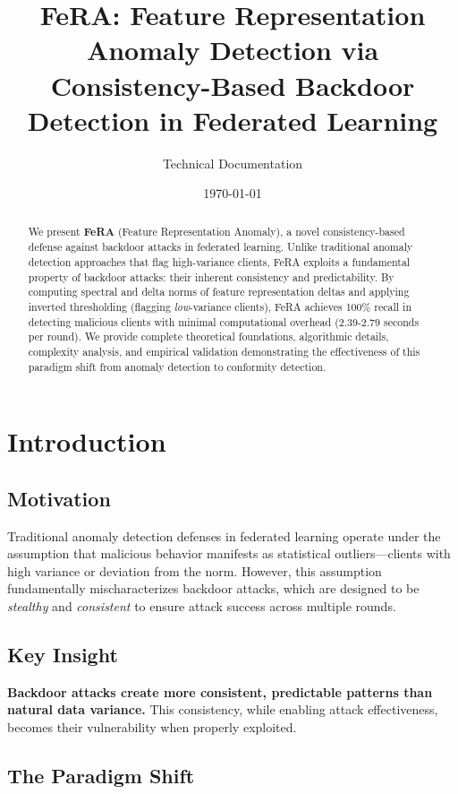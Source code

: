 \documentclass[11pt,a4paper]{article}
\title{\textbf{FeRA: Feature Representation Anomaly Detection via Consistency-Based Backdoor Detection in Federated Learning}}
\author{Technical Documentation}
\date{\today}
\begin{document}
\maketitle

\begin{abstract}
We present \textbf{FeRA} (Feature Representation Anomaly), a novel consistency-based defense against backdoor attacks in federated learning. Unlike traditional anomaly detection approaches that flag high-variance clients, FeRA exploits a fundamental property of backdoor attacks: their inherent consistency and predictability. By computing spectral and delta norms of feature representation deltas and applying inverted thresholding (flagging \emph{low}-variance clients), FeRA achieves 100\% recall in detecting malicious clients with minimal computational overhead (2.39-2.79 seconds per round). We provide complete theoretical foundations, algorithmic details, complexity analysis, and empirical validation demonstrating the effectiveness of this paradigm shift from anomaly detection to conformity detection.
\end{abstract}

\section{Introduction}

\subsection{Motivation}

Traditional anomaly detection defenses in federated learning operate under the assumption that malicious behavior manifests as statistical outliers---clients with high variance or deviation from the norm. However, this assumption fundamentally mischaracterizes backdoor attacks, which are designed to be \emph{stealthy} and \emph{consistent} to ensure attack success across multiple rounds.

\subsection{Key Insight}

\textbf{Backdoor attacks create more consistent, predictable patterns than natural data variance.} This consistency, while enabling attack effectiveness, becomes their vulnerability when properly exploited.

\subsection{The Paradigm Shift}
\end{document}

